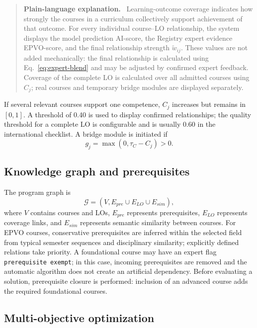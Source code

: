 \documentclass[twoside,11pt]{article}
\newcommand{\Gcal}{\mathcal{G}}
\newenvironment{plainbox}{\begin{quote}\small\noindent\textbf{Plain-language explanation.}\ }{\end{quote}}
\begin{document}
\begin{plainbox}
Learning-outcome coverage indicates how strongly the courses in a curriculum collectively support achievement of that outcome. For every individual course--LO relationship, the system displays the model prediction AI-score, the Registry expert evidence EPVO-score, and the final relationship strength $\tilde w_{ij}$. These values are not added mechanically: the final relationship is calculated using Eq.~\eqref{eq:expert-blend} and may be adjusted by confirmed expert feedback. Coverage of the complete LO is calculated over all admitted courses using $C_j$; real courses and temporary bridge modules are displayed separately.
\end{plainbox}

If several relevant courses support one competence, $C_j$ increases but remains in $[0,1]$. A threshold of 0.40 is used to display confirmed relationships; the quality threshold for a complete LO is configurable and is usually 0.60 in the international checklist. A bridge module is initiated if
\begin{equation}
  g_j=\max(0,\tau_C-C_j)>0.
  \label{eq:gap}
\end{equation}

\subsection{Knowledge graph and prerequisites}

The program graph is
\begin{equation}
  \Gcal=(V,E_{pre}\cup E_{LO}\cup E_{sim}),
  \label{eq:graph}
\end{equation}
where $V$ contains courses and LOs, $E_{pre}$ represents prerequisites, $E_{LO}$ represents coverage links, and $E_{sim}$ represents semantic similarity between courses. For EPVO courses, conservative prerequisites are inferred within the selected field from typical semester sequences and disciplinary similarity; explicitly defined relations take priority. A foundational course may have an expert flag \texttt{prerequisite exempt}; in this case, incoming prerequisites are removed and the automatic algorithm does not create an artificial dependency. Before evaluating a solution, prerequisite closure is performed: inclusion of an advanced course adds the required foundational courses.

\subsection{Multi-objective optimization}
\end{document}
